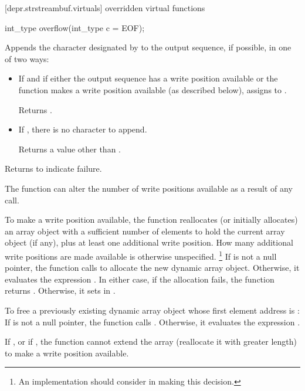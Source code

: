 [depr.strstreambuf.virtuals]{ overridden virtual functions}

%
\begin{itemdecl}
int_type overflow(int_type c = EOF);
\end{itemdecl}

\begin{itemdescr}
\pnum
\effects
Appends the character designated by  to the output
sequence, if possible, in one of two ways:
\begin{itemize}
\item
If
and if either the output sequence has a write position available or
the function makes a write position available
(as described below),
assigns  to
.

Returns
.

\item
If
,
there is no character to append.

Returns a value other than .
\end{itemize}

\pnum
Returns
to indicate failure.

\pnum
\remarks
The function can alter the number of write positions available as a
result of any call.

\pnum
To make a write position available, the function reallocates
(or initially allocates)
an array object with a sufficient number of elements
 to hold the current array object (if any),
plus at least one additional write position.
How many additional write positions are made
available is otherwise unspecified.%
%
\footnote{An implementation should consider  in making this
decision.}
If  is not a null pointer, the function calls
to allocate the new dynamic array object.
Otherwise, it evaluates the expression
.
In either case, if the allocation fails, the function returns
.
Otherwise, it sets  in .

\pnum
To free a previously existing dynamic array object whose first
element address is :
If  is not a null pointer,
the function calls
.
Otherwise, it evaluates the expression .

\pnum
If
,
or if
,
the function cannot extend the array (reallocate it with greater length) to make a write position available.
\end{itemdescr}

